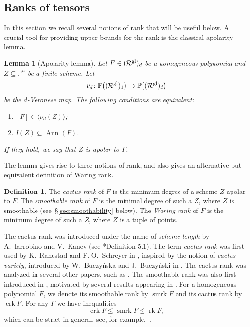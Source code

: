 \documentclass[a4paper,11pt,reqno]{amsart}
\newcommand{\calR}{\mathcal{R}}
\newcommand{\bbP}{\mathbb{P}}
\DeclareMathOperator{\Ann}{Ann}
\DeclareMathOperator{\rk}{rk}
\DeclareMathOperator{\smrk}{smrk}
\DeclareMathOperator{\crk}{crk}
\newcommand{\jjinfo}[1]{\todo[color=yellow!40,bordercolor=brown,size=\footnotesize]{\textbf{TODO: }#1}}
\numberwithin{equation}{section}
\theoremstyle{definition}
\newtheorem{defn}[equation]{Definition}
\theoremstyle{plain}
\newtheorem{lem}[defn]{Lemma}
\theoremstyle{remark}
\newcommand{\calRgl}{\calR^{\rm{gl}}}
\begin{document}
\subsection{Ranks of tensors}
In this section we recall several notions of rank that will be useful below.
A crucial tool for providing upper bounds for the rank is the classical
apolarity lemma.
\begin{lem}[Apolarity lemma]
\label{lem:apolarity_lemma_schemes}
Let ${F}\in (\calRgl)_{d}$%
be a homogeneous {polynomial} and $Z\subseteq\bbP^n$ be a
finite scheme. Let
\[
\nu_d\colon\bbP\bigl((\calRgl)_{1}\bigr)\to\bbP\bigl((\calRgl)_{d}\bigr)
\]
be the $d$-Veronese map. The following conditions are equivalent:
\begin{enumerate}[label=(\arabic*), left= 3pt, widest=2,nosep]
\item $[{F}]\in\langle\nu_d(Z)\rangle$;
\item $I(Z)\subseteq \Ann({F})$.
\end{enumerate}
If they hold, we say that \emph{$Z$ is apolar to ${F}$}.
\end{lem}

The lemma gives rise to three notions of rank,
and also gives an alternative but equivalent definition of Waring rank.
\begin{defn}
    The \emph{cactus rank} of $F$ is the minimum degree of a scheme $Z$ apolar to
    $F$. The \emph{smoothable rank} of $F$ is the {minimal} degree of such a
    $Z$, where $Z$ is smoothable (see~\S\ref{sec:smoothability} below).
    The \emph{Waring rank} of $F$ is the minimum degree of such a $Z$, where $Z$ is a tuple of points.
\end{defn}
The cactus rank was introduced under the name of \textit{scheme length} by A.~Iarrobino and V.~Kanev (see \cite{IK99}*{Definition 5.1}).
The term \textit{cactus rank} was first used by K.~Ranestad and F.-O.~Schreyer
in \cite{RS11}, inspired by the notion of \textit{cactus variety}, introduced
by W.~Buczy\'{n}ska and J.~Buczy\'{n}ski in \cite{BB14}. The cactus rank was analyzed in several other papers, such as  \cites{Bal18, BR13, BBG19}.
The smoothable rank was also first introduced in \cite{RS11},
motivated by several results appearing in \cites{BGI11, BB14,
BGL13}. For a homogeneous polynomial ${F}$, we denote its smoothable rank by
$\smrk {F}$ and its cactus rank by $\crk {F}$.
For any ${F}$ we have inequalities
\[
    \crk {F} \leq \smrk {F}\leq \rk {F},
\]
which can be strict in general, see, for example,~\cites{BB15, huang2020vanishing}.
\end{document}
